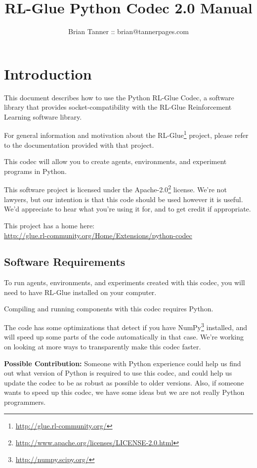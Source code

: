 \documentclass[11pt]{article}
\title{RL-Glue Python Codec 2.0 Manual }
\author{Brian Tanner ::  brian@tannerpages.com}
\date{}
\begin{document}
\maketitle
\tableofcontents

\section{Introduction}

This document describes how to use the Python RL-Glue Codec, a software library that provides socket-compatibility with the RL-Glue Reinforcement Learning software library.  

For general information and motivation about the RL-Glue\footnote{\url{http://glue.rl-community.org/}} project, please refer to the documentation provided with that project.

This codec will allow you to create agents, environments, and experiment programs in Python.

This software project is licensed under the Apache-2.0\footnote{\url{http://www.apache.org/licenses/LICENSE-2.0.html}} license. We're not lawyers, but our intention is that this code 
should be used however it is useful.  We'd appreciate to hear what you're using it for, and to get credit if appropriate.

This project has a home here:\\
\url{http://glue.rl-community.org/Home/Extensions/python-codec}


\subsection{Software Requirements}
To run agents, environments, and experiments created with this codec, you will need to have RL-Glue installed on your computer.

Compiling and running components with this codec requires Python.

The code has some optimizations that detect if you have NumPy\footnote{\url{http://numpy.scipy.org/}} installed, and will speed up some parts of the code automatically in that case.  We're working on looking at more ways to transparently make this codec faster.

\textbf{Possible Contribution: }Someone with Python experience could help us find out what version of Python is required to use this codec, and could help us update the codec
to be as robust as possible to older versions.  Also, if someone wants to speed up this codec, we have some ideas but we are not really Python programmers.
\end{document}
